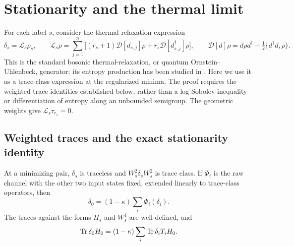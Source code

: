 \section{Stationarity and the thermal limit}\label{sec:stationarity}

For each label $s$, consider the thermal relaxation expression
\begin{equation}\label{eq:thermal-generator}
 \delta_s=\mathcal L_s\rho_s,\qquad
 \mathcal L_s\rho=
 \sum_{j=1}^n\bigl[(r_s+1)\mathcal D[d_{s,j}]\rho
                     +r_s\mathcal D[d_{s,j}^\dagger]\rho\bigr],
 \qquad
 \mathcal D[d]\rho=d\rho d^\dagger-\tfrac12\{d^\dagger d,\rho\}.
\end{equation}
This is the standard bosonic thermal-relaxation, or quantum
Ornstein--Uhlenbeck, generator; its entropy production has been studied
in \cite{HuberKoenigVershynina2017,CarlenMaas2017,DePalmaHuber2018}.
Here we use it as a trace-class expression at the regularized minima.
The proof requires the weighted trace identities established below,
rather than a log-Sobolev inequality or differentiation of entropy along
an unbounded semigroup.  The geometric weights
give $\mathcal L_s\tau_{r_s}=0$.

\subsection{Weighted traces and the exact stationarity identity}

\begin{lemma}
\label{lem:generator-covariance}
At a minimizing pair, $\delta_s$ is traceless and
$W_s^2\delta_sW_s^2$ is trace class.  If $\Phi_i$ is the raw channel with
the other two input states fixed, extended linearly to trace-class
operators, then
\begin{equation}\label{eq:generator-covariance}
 \delta_0=(1-\kappa)\sum_i\Phi_i(\delta_i).
\end{equation}
The traces against the forms $H_s$ and $W_s^4$ are well defined, and
\begin{equation}\label{eq:logarithmic-slicing}
 \operatorname{Tr}\delta_0H_0=(1-\kappa)\sum_i\operatorname{Tr}\delta_iT_iH_0.
\end{equation}
\end{lemma}

